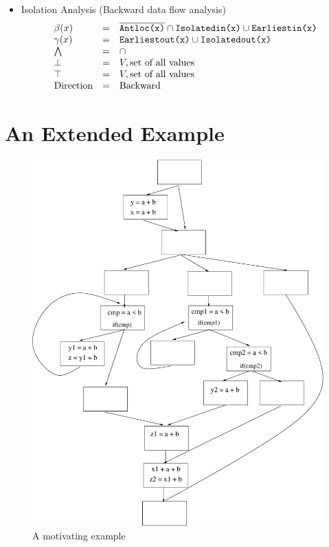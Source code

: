 \begin{itemize}
\item Isolation Analysis (Backward data flow analysis)
\begin{equation}
\begin{array}{l c l}
\beta(x)      &=& \overline{\texttt{Antloc(x)}} \cap \texttt{Isolatedin(x)} \cup \texttt{Earliestin(x)}     \\     
\gamma(x)   &=& \texttt{Earliestout(x)} \cup \texttt{Isolatedout(x)} \\
\bigwedge     &=&  \cap \\
\bot          &=& V, \text{set of all values} \\
\top          &=& V, \text{set of all values} \\
\text{Direction}    &=& \text{Backward}
\end{array}
\end{equation}

\end{itemize}

\chapter{An Extended Example}

\begin{figure}[htbp]
  \begin{center}
     \includegraphics[scale=0.3]{Figs/1} 
  \end{center}
  \caption{A motivating example}
    \label{fig:1} 
\end{figure}

